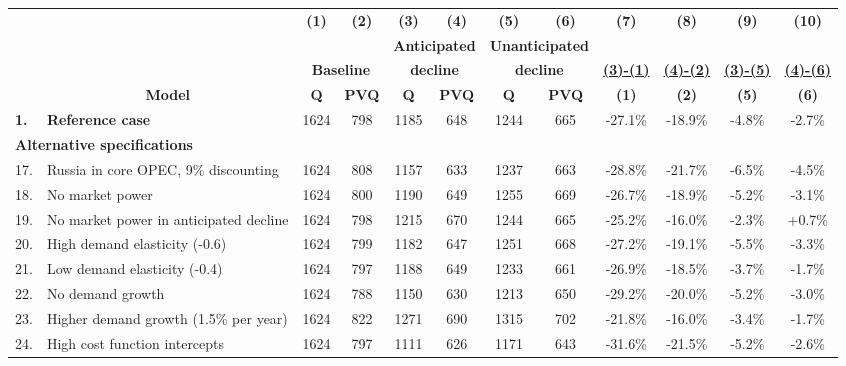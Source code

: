 \begin{tabular} {l l c c c c c c c c c c} \midrule \midrule 
 & & \textbf{(1)} & \textbf{(2)} & \textbf{(3)} & \textbf{(4)} & \textbf{(5)} & \textbf{(6)} & \textbf{(7)} & \textbf{(8)} & \textbf{(9)} & \textbf{(10)} \\ 
 & & & & \multicolumn{2}{c}{\textbf{Anticipated}} & \multicolumn{2}{c}{\textbf{Unanticipated}} & & & & \\ 
 & & \multicolumn{2}{c}{\textbf{Baseline}} & \multicolumn{2}{c}{\textbf{decline}} & \multicolumn{2}{c}{\textbf{decline}} &
    \underline{\textbf{(3)-(1)}} & \underline{\textbf{(4)-(2)}} & \underline{\textbf{(3)-(5)}} & \underline{\textbf{(4)-(6)}} \\ 
 & \multicolumn{1}{c}{\textbf{Model}} & \textbf{Q} & \textbf{PVQ} & \textbf{Q} & \textbf{PVQ} & \textbf{Q} & \textbf{PVQ} & 
    \textbf{(1)} & \textbf{(2)} & \textbf{(5)} & \textbf{(6)} \\ 
\midrule 
\textbf{1.} & \textbf{Reference case} & 1624 & 798 & 1185 & 648 & 1244 & 665 & -27.1\% & -18.9\% & -4.8\% & -2.7\% \\ 
\midrule 
\multicolumn{4}{l}{\textbf{Alternative specifications}} & & & & & & & & \\ 
17. & Russia in core OPEC, 9\% discounting & 1624 & 808 & 1157 & 633 & 1237 & 663 & -28.8\% & -21.7\% & -6.5\% & -4.5\% \\ 
18. & No market power & 1624 & 800 & 1190 & 649 & 1255 & 669 & -26.7\% & -18.9\% & -5.2\% & -3.1\% \\ 
19. & No market power in anticipated decline & 1624 & 798 & 1215 & 670 & 1244 & 665 & -25.2\% & -16.0\% & -2.3\% & +0.7\% \\ 
20. & High demand elasticity (-0.6) & 1624 & 799 & 1182 & 647 & 1251 & 668 & -27.2\% & -19.1\% & -5.5\% & -3.3\% \\ 
21. & Low demand elasticity (-0.4) & 1624 & 797 & 1188 & 649 & 1233 & 661 & -26.9\% & -18.5\% & -3.7\% & -1.7\% \\ 
22. & No demand growth & 1624 & 788 & 1150 & 630 & 1213 & 650 & -29.2\% & -20.0\% & -5.2\% & -3.0\% \\ 
23. & Higher demand growth (1.5\% per year) & 1624 & 822 & 1271 & 690 & 1315 & 702 & -21.8\% & -16.0\% & -3.4\% & -1.7\% \\ 
24. & High cost function intercepts & 1624 & 797 & 1111 & 626 & 1171 & 643 & -31.6\% & -21.5\% & -5.2\% & -2.6\% \\ 
\midrule 
\end{tabular}
